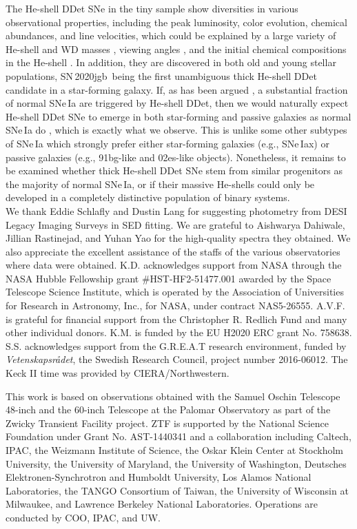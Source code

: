 \documentclass[twocolumn]{aastex631}
\newcommand{\sn}{SN\,2020jgb}
\begin{document}
\begin{CJK*}{UTF8}{gbsn}
The He-shell DDet SNe in the tiny sample show diversities in various observational properties, including the peak luminosity, color evolution, chemical abundances, and line velocities, which could be explained by a large variety of He-shell and WD masses \citep{polin_observational_2019,Shen_2D_2021}, viewing angles \citep{Shen_2D_2021}, and the initial chemical compositions in the He-shell \citep{Kromer_DD_2010}. In addition, they are discovered in both old and young stellar populations, \sn\ being the first unambiguous thick He-shell DDet candidate in a star-forming galaxy. If, as has been argued \citep[e.g.,][]{Sanders_2021, Eitner_2022}, a substantial fraction of normal SNe\,Ia are triggered by He-shell DDet, then we would naturally expect He-shell DDet SNe to emerge in both star-forming and passive galaxies as normal SNe\,Ia do \citep[e.g.,][]{Sullivan_2006,Smith_2012}, which is exactly what we observe. This is unlike some other subtypes of SNe\,Ia \citep{Jha_2019} which strongly prefer either star-forming galaxies (e.g., SNe\,Iax) or passive galaxies (e.g., 91bg-like and 02es-like objects). Nonetheless, it remains to be examined whether thick He-shell DDet SNe stem from similar progenitors as the majority of normal SNe\,Ia, or if their massive He-shells could only be developed in a completely distinctive population of binary systems.\\

\noindent We thank Eddie Schlafly and Dustin Lang for suggesting photometry from DESI Legacy Imaging Surveys in SED fitting. We are grateful to Aishwarya Dahiwale, Jillian Rastinejad, and Yuhan Yao for the high-quality spectra they obtained. We also appreciate the excellent assistance of the staffs of the various observatories where data were obtained. K.D. acknowledges support from NASA through the NASA Hubble Fellowship grant \#HST-HF2-51477.001 awarded by the Space Telescope Science Institute, which is operated by the Association of Universities for Research in Astronomy, Inc., for NASA, under contract NAS5-26555. A.V.F. is grateful for financial support from the Christopher R. Redlich Fund and many other individual donors. K.M. is funded by the EU H2020 ERC grant No. 758638. S.S. acknowledges support from the G.R.E.A.T research environment, funded by {\em Vetenskapsr\aa det}, the Swedish Research Council, project number 2016-06012. The Keck II time was provided by CIERA/Northwestern.

This work is based on observations obtained with the Samuel Oschin Telescope 48-inch and the 60-inch Telescope at the Palomar Observatory as part of the Zwicky Transient Facility project. ZTF is supported by the National Science Foundation under Grant No. AST-1440341 and a collaboration including Caltech, IPAC, the Weizmann Institute of Science, the Oskar Klein Center at Stockholm University, the University of Maryland, the University of Washington, Deutsches Elektronen-Synchrotron and Humboldt University, Los Alamos National Laboratories, the TANGO Consortium of Taiwan, the University of Wisconsin at Milwaukee, and Lawrence Berkeley National Laboratories. Operations are conducted by COO, IPAC, and UW. 


\end{CJK*}
\end{document}
